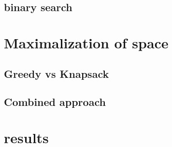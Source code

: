 \subsection{binary search}

\section{Maximalization of space}

\subsection{Greedy vs Knapsack}

\subsection{Combined approach}

\section{results}


